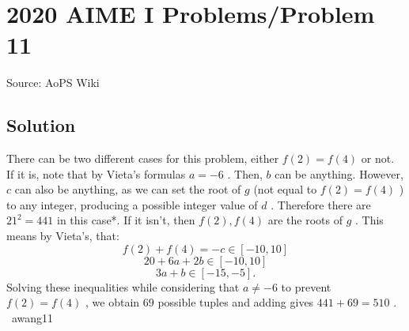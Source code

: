 \documentclass[12pt]{article}
\begin{document}
\section*{{2020 AIME I Problems/Problem 11}}
Source: AoPS Wiki

\subsection*{Solution}
There can be two different cases for this problem, either $f(2)=f(4)$ or not. If it is, note that by Vieta's formulas $a = -6$ . Then, $b$ can be anything. However, $c$ can also be anything, as we can set the root of $g$ (not equal to $f(2) = f(4)$ ) to any integer, producing a possible integer value of $d$ . Therefore there are $21^2 = 441$ in this case*. If it isn't, then $f(2),f(4)$ are the roots of $g$ . This means by Vieta's, that: \[f(2)+f(4) = -c \in [-10,10]\] \[20 + 6a + 2b \in [-10,10]\] \[3a + b \in [-15,-5].\] Solving these inequalities while considering that $a \neq -6$ to prevent $f(2) = f(4)$ , we obtain $69$ possible tuples and adding gives $441+69=\boxed{510}$ .
~awang11
\end{document}
